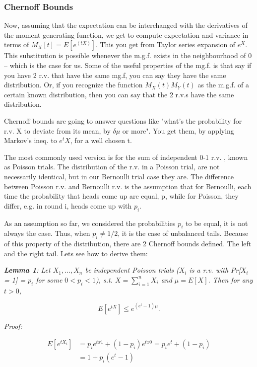 \documentclass[11pt]{article}
\begin{document}
\subsubsection{Chernoff Bounds}
Now, assuming that the expectation can be interchanged with the derivatives of the moment generating function, we get to compute expectation and variance in terms of $M_X[t] = E[e^{(tX)}]$. This you get from Taylor series expansion of $e^X$. This substitution is possible whenever the m.g.f. exists in the neighbourhood of 0 -- which is the case for us. Some of the useful properties of the mg.f. is that say if you have 2 r.v. that have the same mg.f, you can say they have the same distribution. Or, if you recognize the function $M_X(t)M_Y(t)$ as the m.g.f. of a certain known distribution, then you can say that the 2 r.v.s have the same distribution. 

Chernoff bounds are going to answer questions like "what's the probability for r.v. X to deviate from its mean, by $\delta\mu$ or more". You get them, by applying Markov's ineq. to $e^tX$, for a well chosen t. 

The most commonly used version is for the sum of independent 0-1 r.v. , known as Poisson trials.  The distribution of the r.v. in a Poisson trial, are not necessarily identical, but in our Bernoulli trial case they are. The difference between Poisson r.v. and Bernoulli r.v. is the assumption that for Bernoulli, each time the probability that heads come up are equal, p, while for Poisson, they differ, e.g. in round i, heads come up with $p_i$. 

\medskip
As an assumption so far, we considered the probabilities $p_i$ to be equal, it is not always the case. Thus, when $p_i \neq 1/2$, it is the case of unbalanced tails. Because of this property of the distribution, there are 2 Chernoff bounds defined. The left and the right tail. Lets see how to derive them:

\medskip
\textit{\textbf{Lemma 1}: Let $X_1, \dots , X_n$ be independent Poisson trials ($X_i$ is a r.v. with Pr[$X_i$ = 1] = $p_i$ for some $0 < p_i < 1$), s.t. $X = \sum_{i = 1}^{n}X_i$ and $\mu = E[X]$. Then for any $t > 0$,}

\begin{equation}
 E[e^{tX}] \leq e^{(e^t - 1)\mu}. 
\end{equation}

\emph{Proof:} 

\begin{equation}
\begin{split}
  E[e^{tX_i}]& = p_ie^{tx1} + (1-p_i)e^{tx0} = p_ie^t + (1-p_i) \\
   & = 1 + p_i(e^t-1)   %
\end{split}  
\end{equation}
\end{document}
